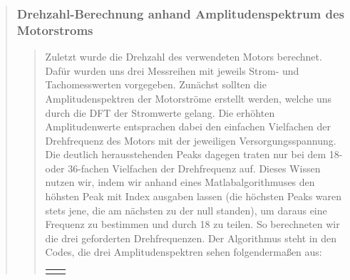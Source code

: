 \begin{quote}
\begin{quote}
        \end{quote}%
         
        \subsubsection{Drehzahl-Berechnung anhand Amplitudenspektrum des
        Motorstroms}
        \begin{quote}
        
        Zuletzt wurde die Drehzahl des verwendeten Motors berechnet. Dafür wurden
        uns drei Messreihen mit jeweils Strom- und Tachomesswerten vorgegeben.
        Zunächst sollten die Amplitudenspektren der Motorströme erstellt werden,
        welche uns durch die DFT der Stromwerte gelang. Die erhöhten Amplitudenwerte entsprachen
        dabei den einfachen Vielfachen der Drehfrequenz des Motors mit der
        jeweiligen Versorgungsspannung. Die deutlich herausstehenden Peaks dagegen
        traten nur bei dem 18- oder 36-fachen Vielfachen der Drehfrequenz auf.
        Dieses Wissen nutzen wir, indem wir anhand eines Matlabalgorithmuses den
        höhsten Peak mit Index ausgaben lassen (die höchsten Peaks waren stets
        jene, die am nächsten zu der null standen), um daraus eine Frequenz zu
        bestimmen und durch 18 zu teilen. So berechneten wir die drei geforderten
        Drehfrequenzen. Der Algorithmus steht in den Codes, die drei
        Amplitudenspektren sehen folgendermaßen aus:
        
         \begin{center}
                \begin{tabular}{ll}
    
                \hspace{-12em}
                    \begin{minipage}{0.6\textwidth}
    

\end{minipage}
\end{tabular}
\end{center}
\end{quote}
\end{quote}
